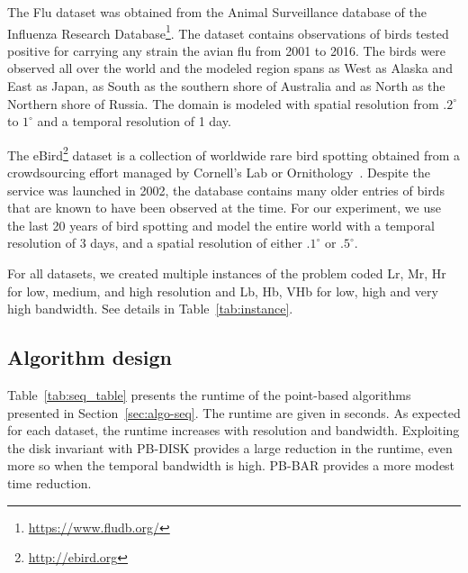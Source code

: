 \documentclass{article}
\begin{document}
The Flu dataset was obtained from the Animal Surveillance
database of the Influenza Research
Database\footnote{\url{https://www.fludb.org/}}.
The dataset contains observations of birds tested positive for
carrying any strain the avian flu from 2001 to 2016. The birds were
observed all over the world and the modeled region spans as West as
Alaska and East as Japan, as South as the southern shore of Australia
and as North as the Northern shore of Russia. The domain is modeled
with spatial resolution from $.2^\circ$ to $1^\circ$ and a temporal
resolution of 1 day.

The eBird\footnote{\url{http://ebird.org}} dataset is a collection of worldwide rare bird spotting
obtained from a crowdsourcing effort managed by Cornell's Lab or
Ornithology~\cite{ebird}. Despite the service was launched in 2002,
the database contains many older entries of birds that are known to
have been observed at the time. For our experiment, we use the last 20
years of bird spotting and model the entire world with a temporal
resolution of 3 days, and a spatial resolution of either $.1^\circ$ or
$.5^\circ$.

For all datasets, we created multiple instances of the problem coded
Lr, Mr, Hr for low, medium, and high resolution and Lb, Hb, VHb for
low, high and very high bandwidth. See details in Table~\ref{tab:instance}. 

\begin{table}
    \resizebox{\linewidth}{!}{}
  \caption{Properties of the datasets. The domain is expressed in voxels
    and in MB. Bandwidth are expressed in voxels.}
  \label{tab:instance}
\end{table}

\subsection{Algorithm design}


\begin{table}
  \resizebox{\linewidth}{!}{}
  \caption{Runtime of different algorithm. The speedup of PB-SYM over PB is given.  }
  \label{tab:seq_table}
\end{table}

Table~\ref{tab:seq_table} presents the runtime of the point-based
algorithms presented in Section~\ref{sec:algo-seq}. The runtime are
given in seconds. As expected for each dataset, the runtime increases
with resolution and bandwidth. Exploiting the disk invariant with
PB-DISK provides a large reduction in the runtime, even more so when
the temporal bandwidth is high. PB-BAR provides a more modest time
reduction.
\end{document}
